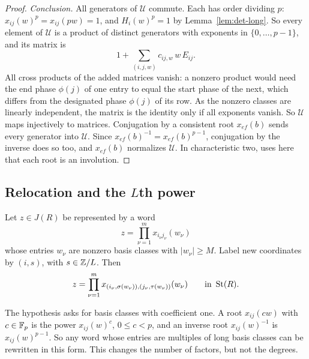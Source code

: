 \begin{proof}
\emph{Conclusion.} All generators of $\mathcal U$ commute. Each has order dividing $p$: $x_{ij}(w)^p=x_{ij}(pw)=1$, and
$H_i(w)^p=1$ by Lemma~\ref{lem:det-long}. So every element of $\mathcal U$ is a product of distinct generators with
exponents in $\{0,\dots,p-1\}$, and its matrix is
\[
 1+\sum_{(i,j,w)}c_{ij,w}\,w\,E_{ij}.
\]
All cross products of the added matrices vanish: a nonzero product would need the end phase $\phi(j)$ of one entry to
equal the start phase of the next, which differs from the designated phase $\phi(j)$ of its row. As the nonzero classes
are linearly independent, the matrix is the identity only if all exponents vanish. So $\mathcal U$ maps injectively to
matrices. Conjugation by a consistent root $x_{ef}(b)$ sends every generator into $\mathcal U$. Since
$x_{ef}(b)^{-1}=x_{ef}(b)^{p-1}$, conjugation by the inverse does so too, and $x_{ef}(b)$ normalizes $\mathcal U$. In
characteristic two, \cite{OAI247rf} uses here that each root is an involution.
\end{proof}

\subsection{Relocation and the \texorpdfstring{$L$}{L}th power}

\begin{lemma}\label{lem:det-relocation}
Let $z\in J(R)$ be represented by a word
\[
 z=\prod_{\nu=1}^m x_{i_\nu j_\nu}(w_\nu)
\]
whose entries $w_\nu$ are nonzero basis classes with $|w_\nu|\geq M$. Label new coordinates by $(i,s)$, with $s\in\mathbb Z/L$.
Then
\begin{equation}\label{eq:det-relocation}
 z=\prod_{\nu=1}^m x_{(i_\nu,\sigma(w_\nu)),(j_\nu,\tau(w_\nu))}(w_\nu)\qquad\text{in }\operatorname{St}(R).
\end{equation}
\end{lemma}

The hypothesis asks for basis classes with coefficient one. A root $x_{ij}(cw)$ with $c\in\mathbb F_p$ is the power
$x_{ij}(w)^c$, $0\leq c<p$, and an inverse root $x_{ij}(w)^{-1}$ is $x_{ij}(w)^{p-1}$. So any word whose entries are
multiples of long basis classes can be rewritten in this form. This changes the number of factors, but not the degrees.

